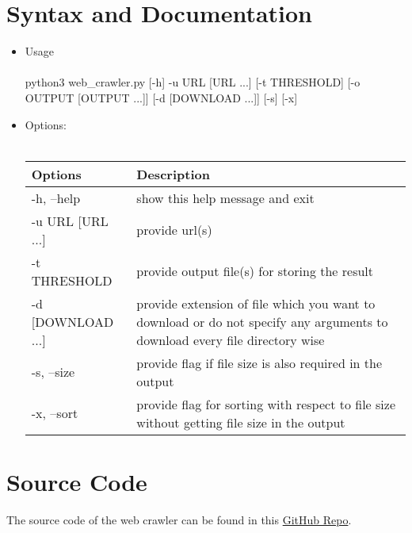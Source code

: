 \documentclass{article}
\begin{document}
\section{Syntax and Documentation}
\begin{itemize}
\item{\Large Usage \\ \\ python3 web\_crawler.py [-h] -u URL [URL ...] [-t THRESHOLD] [-o OUTPUT [OUTPUT ...]] [-d [DOWNLOAD ...]] [-s] [-x]}

\item{\Large Options: \\ \\ \normalsize
\begin{tabular}{ | p{7 cm} | p{7 cm} | } 
\hline 
 \textbf{Options} & \textbf{Description} \\
 \hline
 \hline
 -h, --help & show this help message and exit \\
 \hline 
 -u URL [URL ...] & provide url(s)  \\
 \hline
 -t THRESHOLD & provide output file(s) for storing the result\\
 \hline
 -d [DOWNLOAD ...] & provide extension of file which you want to download or do not specify any arguments to download every file directory wise \\
 \hline
 -s, --size & provide flag if file size is also required in the output \\
 \hline
 -x, --sort & provide flag for sorting with respect to file size without getting file size in the output\\
 \hline
 
\end{tabular}}
\end{itemize}

\section{Source Code}
The source code of the web crawler can be found in this \href{https://github.com/rijulbhat/WebCrawler_Python.git}{GitHub Repo}.
%



\printbibliography
\end{document}
